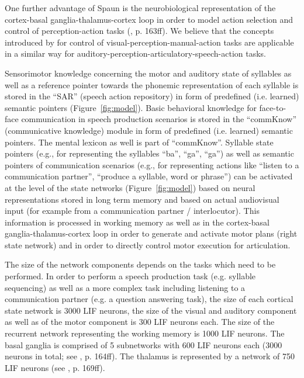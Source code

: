 \documentclass[conference]{IEEEtran}
\begin{document}
One further advantage of Spaun is the neurobiological representation
of the cortex-basal ganglia-thalamus-cortex loop in order to model
action selection and control of perception-action tasks
(\cite{eliasmith2013}, p. 163ff). We believe that the concepts
introduced by \cite{eliasmith2013} for control of
visual-perception-manual-action tasks are applicable in a similar way
for auditory-perception-articulatory-speech-action tasks.

Sensorimotor knowledge concerning the motor and auditory state of
syllables as well as a reference pointer towards the
phonemic representation of each syllable
is stored in the ``SAR'' (speech action repository) in form of
predefined (i.e. learned) semantic pointers (Figure~\ref{fig:model}).
Basic behavioral knowledge for face-to-face communication in speech
production scenarios is stored in the  ``commKnow'' (communicative knowledge)
module in form of predefined (i.e. learned) semantic pointers.
The mental lexicon as well is part of ``commKnow''.
Syllable state pointers (e.g., for representing the syllables
``ba'', ``ga'', ``ga'') as well as semantic pointers of
communication scenarios (e.g., for representing actions like
``listen to a communication partner'', ``produce a syllable, word or
phrase'') can be activated at the level of the state networks
(Figure~\ref{fig:model})
based on neural representations stored in long term memory
and based on actual audiovisual input (for example from a
communication partner / interlocutor).
This information is processed
in working memory as well as in the
cortex-basal ganglia-thalamus-cortex loop in order to generate and
activate motor plans (right state network) and in order to directly
control motor execution for articulation.

The size of the network components depends on the tasks which need to
be performed. In order to perform a speech production task
(e.g. syllable sequencing) as well as a more complex task including listening to
a communication partner (e.g. a question answering task), the size of
each cortical state network is 3000 LIF neurons,
the size of the visual and auditory component
as well as of the motor component is
300 LIF neurons each. The size of the recurrent network representing
the working memory is 1000 LIF neurons. The basal ganglia is comprised of
5 subnetworks with 600 LIF neurons each (3000 neurons in
total; see \cite{eliasmith2013}, p. 164ff). The thalamus is
represented by a network of 750 LIF neurons (see
\cite{eliasmith2013}, p. 169ff).
\end{document}
